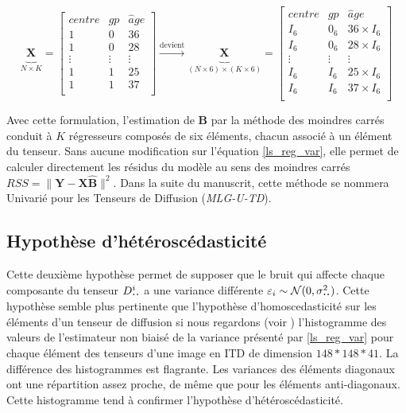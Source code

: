 \begin{equation}
    \underbrace{\mathbf{X}_{}}_{N\times K} = \left[\begin{array}{ccc} 
                                             centre & gp & \hat{a}ge\\
                                             1 & 0 & 36\\
                                             1 & 0 & 28\\
                                             \vdots & \vdots & \vdots\\
                                             1 & 1 & 25\\
                                             1 & 1 & 37\\
					      \end{array}\right]
  \xrightarrow{\text{devient}}
  \underbrace{\mathbf{X}_{}}_{(N\times 6)\times (K\times 6)} = \left[\begin{array}{ccc}
								centre & gp & \hat{a}ge\\
								I_{6} & 0_{6} & 36\times I_{6}\\
								I_{6} & 0_{6} & 28\times I_{6}\\
								\vdots & \vdots & \vdots\\
								I_{6} & I_{6} & 25\times I_{6}\\
								I_{6} & I_{6} & 37\times I_{6}\\
								\end{array}\right]
\end{equation}

Avec cette formulation, l'estimation de $\mathbf{B}$ par la méthode des moindres carrés conduit à $K$ régresseurs composés de six éléments, 
chacun associé à un élément du tenseur.
Sans aucune modification sur l'équation \eqref{ls_reg_var}, 
elle permet de calculer directement les résidus du modèle au sens des moindres carrés $RSS = \|\mathbf{Y} - \mathbf{X}\mathbf{\hat{B}} \|^{2}$.
Dans la suite du manuscrit, cette méthode se nommera \mlg Univarié pour les Tenseurs de Diffusion (\textit{MLG-U-TD}).


\subsection{Hypothèse d'hétéroscédasticité}
Cette deuxième hypothèse permet de supposer que le bruit qui affecte chaque composante du tenseur $D_{\largedot\largedot}^i$ 
a une variance différente $\varepsilon_i \sim \mathcal{N}(0, \sigma_{\largedot\largedot}^2)$.
Cette hypothèse semble plus pertinente que l'hypothèse d'homoscedasticité sur les éléments d'un tenseur de diffusion 
si nous regardons (voir ) l'histogramme des valeurs de l'estimateur non biaisé de la variance 
présenté par \eqref{ls_reg_var} pour chaque élément des tenseurs d'une image en ITD de dimension $148*148*41$. 
La différence des histogrammes est flagrante.
Les variances des éléments diagonaux ont une répartition assez proche, de même que pour les éléments anti-diagonaux.
Cette histogramme tend à confirmer l'hypothèse d'hétéroscédasticité.

